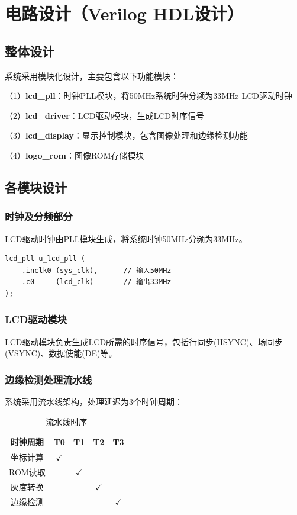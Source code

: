\documentclass[12pt,hyperref,a4paper,UTF8]{ctexart}
\begin{document}
\section{电路设计（Verilog HDL设计）}

\subsection{整体设计}

系统采用模块化设计，主要包含以下功能模块：

（1）\textbf{lcd\_pll}：时钟PLL模块，将50MHz系统时钟分频为33MHz LCD驱动时钟

（2）\textbf{lcd\_driver}：LCD驱动模块，生成LCD时序信号

（3）\textbf{lcd\_display}：显示控制模块，包含图像处理和边缘检测功能

（4）\textbf{logo\_rom}：图像ROM存储模块

\subsection{各模块设计}

\subsubsection{时钟及分频部分}

LCD驱动时钟由PLL模块生成，将系统时钟50MHz分频为33MHz。

\begin{lstlisting}[caption={PLL时钟模块例化}]
lcd_pll u_lcd_pll (
    .inclk0 (sys_clk),      // 输入50MHz
    .c0     (lcd_clk)       // 输出33MHz
);
\end{lstlisting}

\subsubsection{LCD驱动模块}

LCD驱动模块负责生成LCD所需的时序信号，包括行同步(HSYNC)、场同步(VSYNC)、数据使能(DE)等。

\subsubsection{边缘检测处理流水线}

系统采用流水线架构，处理延迟为3个时钟周期：

\begin{table}[H]
\centering
\caption{流水线时序}
\begin{tabular}{ccccc}
\toprule
\textbf{时钟周期} & \textbf{T0} & \textbf{T1} & \textbf{T2} & \textbf{T3} \\
\midrule
坐标计算 & $\checkmark$ & & & \\
ROM读取 & & $\checkmark$ & & \\
灰度转换 & & & $\checkmark$ & \\
边缘检测 & & & & $\checkmark$ \\
\bottomrule
\end{tabular}
\end{table}
\end{document}
